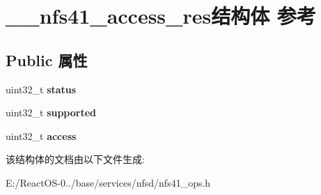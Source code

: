 \hypertarget{struct____nfs41__access__res}{}\section{\+\_\+\+\_\+nfs41\+\_\+access\+\_\+res结构体 参考}
\label{struct____nfs41__access__res}
\subsection*{Public 属性}
\begin{DoxyCompactItemize}
\item 
\mbox{\label{struct____nfs41__access__res_acfc7dafc22c4dee96cbd3cc7c5181cb1}} 
uint32\+\_\+t {\bfseries status}
\item 
\mbox{\label{struct____nfs41__access__res_ae4fa211a61156b07f78ea4c697b45006}} 
uint32\+\_\+t {\bfseries supported}
\item 
\mbox{\label{struct____nfs41__access__res_a842252f9e8a6c5a78ef5a980d898cd6a}} 
uint32\+\_\+t {\bfseries access}
\end{DoxyCompactItemize}


该结构体的文档由以下文件生成\+:\begin{DoxyCompactItemize}
\item 
E\+:/\+React\+O\+S-\/0../base/services/nfsd/nfs41\+\_\+ops.\+h\end{DoxyCompactItemize}
